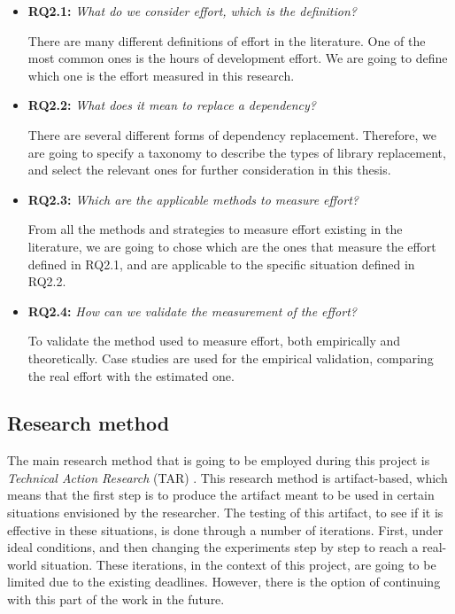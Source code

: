 \begin{itemize}
  \item \textbf{RQ2.1:} \textit{What do we consider effort, which is the definition?}

  There are many different definitions of effort in the literature. One of the most common ones is the hours of development effort. We are going to define which one is the effort measured in this research. 

  \item \textbf{RQ2.2:} \textit{What does it mean to replace a dependency?}

  There are several different forms of dependency replacement. Therefore, we are going to specify a taxonomy to describe the types of library replacement, and select the relevant ones for further consideration in this thesis.

  \item \textbf{RQ2.3:} \textit{Which are the applicable methods to measure effort?}

  From all the methods and strategies to measure effort existing in the literature, we are going to chose which are the ones that measure the effort defined in RQ2.1, and are applicable to the specific situation defined in RQ2.2.

  \item \textbf{RQ2.4:} \textit{How can we validate the measurement of the effort?}

  To validate the method used to measure effort, both empirically and theoretically. Case studies are used for the empirical validation, comparing the real effort with the estimated one.
\end{itemize}

\subsection{Research method}
The main research method that is going to be employed during this project is \textit{Technical Action Research} (TAR) \cite{wieringa2012technical}.
This research method is artifact-based, which means that the first step is to produce the artifact meant to be used in certain situations envisioned by the researcher. The testing of this artifact, to see if it is effective in these situations, is done through a number of iterations. First, under ideal conditions, and then changing the experiments step by step to reach a real-world situation. These iterations, in the context of this project, are going to be limited due to the existing deadlines. However, there is the option of continuing with this part of the work in the future.

